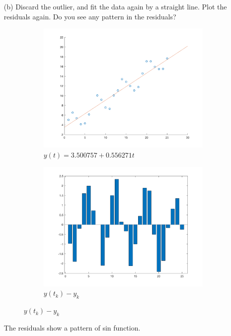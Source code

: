 \documentclass[10pt]{report}
\begin{document}
\begin{enumerate}
	\item [(b)]
	Discard the outlier, and fit the data again by a straight line. Plot the residuals again. Do you see any pattern in the residuals?
	
	\begin{figure}[H]
		\begin{subfigure}[b]{0.5\linewidth}
			\centering
			\includegraphics[width=\linewidth]{hw5ca1b_fit}
			\caption*{$y(t) = 3.500757 + 0.556271t$}
		\end{subfigure}
		\begin{subfigure}[b]{0.5\linewidth}
			\centering
			\includegraphics[width=\linewidth]{hw5ca1b_residual} 
			\caption*{$y(t_k)-y_k$}
		\end{subfigure}
	\end{figure}
	The residuals show a pattern of sin function.
	

\end{enumerate}
\end{document}
